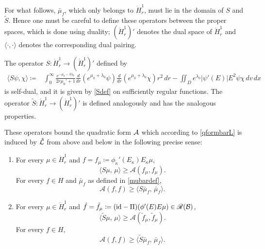 \documentclass[11pt]{article}
\begin{document}
For what follows, $\bar \mu_f$, which only belongs to $\dot H^1_r$,
must lie in the domain of $S$ and $\tilde S$.
Hence one must be careful to define these operators between
the proper spaces, which is done using duality;
$(\dot H^1_r)'$ denotes the dual space of $\dot H^1_r$
and $\langle\cdot,\cdot\rangle$ denotes the corresponding
dual pairing.
%
\begin{lemma} \label{redEVdef}
   The operator $S \colon \dot H^1_r \to  (\dot H^1_r)'$ defined by
  \begin{align*}
    \langle S \psi,\chi\rangle
    \coloneqq & \int_0^\infty \frac{e^{-\mu_0-3\lambda_0}}{2r\mu_0'+1}
    \frac{d}{dr} \left(e^{\mu_0+\lambda_0}\psi\right)
    \frac{d}{dr} \left(e^{\mu_0+\lambda_0}\chi\right)r^2\,dr
    - \iint_{D} e^{\lambda_0} |\psi'(E)|E^2 \psi \chi\,dv\,dx
  \end{align*}
  is self-dual, and it is given by \eqref{Sdef} on
  sufficiently regular functions.
  The operator $\tilde S\colon \dot H^1_r \to  (\dot H^1_r)'$
  is defined analogously and has the analogous properties.
\end{lemma}
%
%
These operators bound the quadratic form ${\cal A}$ which
according to \eqref{qformbarL} is induced by $\tilde{{\cal L}}$
from above and below in the following precise sense:
%
%
\begin{proposition}\label{ASest}
\begin{enumerate}
\item[(a)]
  For every $\mu\in \dot H^1_r$ and
  $f = f_\mu \coloneqq \phi_\kappa'(E_\kappa)E_\kappa\mu$,
  \[ 
  \langle S\mu,\,\mu\rangle \ge {\mathcal A}( f_\mu, f_\mu).
  \]
  For every $f\in H$ and $\bar\mu_f$ as defined in \eqref{mubardef},
  \[ 
  {\mathcal A}( f, f) \ge \langle S\bar\mu_f,\,\bar\mu_f\rangle.
  \]
\item[(b)]
  For every $\mu\in \dot H^1_r$ and
  $\tilde f = \tilde f_\mu \coloneqq
  (\mathrm{id}-\Pi)(\phi'(E)E \mu)\in {\mathscr R}(\mathcal B)$,
  \[
  \langle \tilde S\mu,\,\mu\rangle \ge
  {\mathcal A}( \tilde f_\mu, \tilde f_\mu).
  \]
  For every $f\in H$,
  \[ 
  {\mathcal A}( f, f) \ge
  \langle\tilde S\bar\mu_f,\,\bar\mu_f\rangle.
  \]
\end{enumerate}
\end{proposition}

\end{document}
